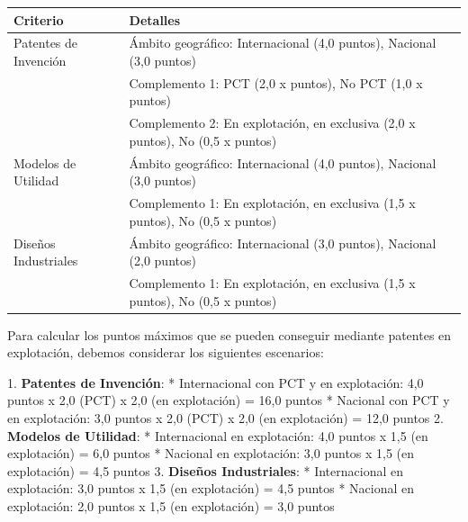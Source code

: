 \documentclass{article}
\begin{document}
\begin{itemize}
\begin{itemize}
                        \vspace{0.4cm}
                        \begin{table}[h!]\centering\renewcommand{\arraystretch}{1.3}
                              \begin{tabular}{|p{}|p{}|}\hline
                                    Criterio              & Detalles                                                                      \\\hline
                                    Patentes de Invención & Ámbito geográfico: Internacional (4,0 puntos), Nacional (3,0 puntos)          \\\hline
                                                          & Complemento 1: PCT (2,0 x puntos), No PCT (1,0 x puntos)                      \\\hline
                                                          & Complemento 2: En explotación, en exclusiva (2,0 x puntos), No (0,5 x puntos) \\\hline
                                    Modelos de Utilidad   & Ámbito geográfico: Internacional (4,0 puntos), Nacional (3,0 puntos)          \\\hline
                                                          & Complemento 1: En explotación, en exclusiva (1,5 x puntos), No (0,5 x puntos) \\\hline
                                    Diseños Industriales  & Ámbito geográfico: Internacional (3,0 puntos), Nacional (2,0 puntos)          \\\hline
                                                          & Complemento 1: En explotación, en exclusiva (1,5 x puntos), No (0,5 x puntos) \\\hline
                              \end{tabular}\end{table}
                        \vspace{0.4cm}

                        Para calcular los puntos máximos que se pueden conseguir mediante patentes en explotación, debemos considerar los siguientes escenarios:

                        1. \textbf{Patentes de Invención}:
                        * Internacional con PCT y en explotación: 4,0 puntos x 2,0 (PCT) x 2,0 (en explotación) = 16,0 puntos
                        * Nacional con PCT y en explotación: 3,0 puntos x 2,0 (PCT) x 2,0 (en explotación) = 12,0 puntos
                        2. \textbf{Modelos de Utilidad}:
                        * Internacional en explotación: 4,0 puntos x 1,5 (en explotación) = 6,0 puntos
                        * Nacional en explotación: 3,0 puntos x 1,5 (en explotación) = 4,5 puntos
                        3. \textbf{Diseños Industriales}:
                        * Internacional en explotación: 3,0 puntos x 1,5 (en explotación) = 4,5 puntos
                        * Nacional en explotación: 2,0 puntos x 1,5 (en explotación) = 3,0 puntos


\end{itemize}
\end{itemize}
\end{document}
